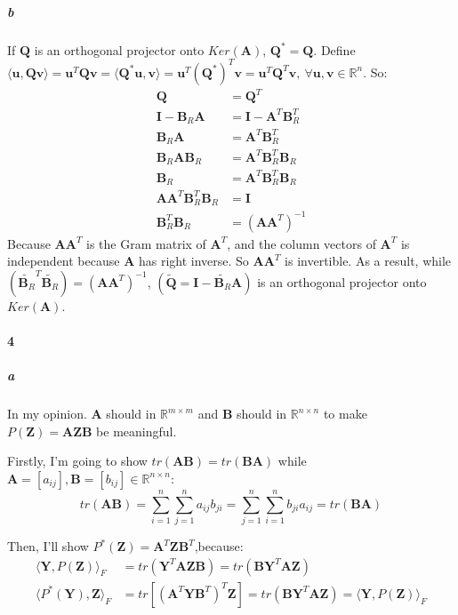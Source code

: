 \documentclass[22pt]{article}
\begin{document}
		\subparagraph{b} If $\mathbf{Q}$ is an orthogonal projector onto $Ker(\mathbf{A})$, $\mathbf{Q}^* = \mathbf{Q}$. Define $\langle \mathbf{u},\mathbf{Q}\mathbf{v} \rangle = \mathbf{u}^T\mathbf{Q}\mathbf{v}  = \langle  \mathbf{Q}^*\mathbf{u},\mathbf{v} \rangle = \mathbf{u}^T(\mathbf{Q}^*)^T\mathbf{v} = \mathbf{u}^T\mathbf{Q}^T\mathbf{v},\ \forall \mathbf{u,v} \in \mathbb{R}^n$. So:
		\begin{align}
			\mathbf{Q} & = \mathbf{Q}^T\\
			\mathbf{I} - \mathbf{B}_R\mathbf{A} & = \mathbf{I} - \mathbf{A}^T\mathbf{B}_R^T\\
			\mathbf{B}_R\mathbf{A} & = \mathbf{A}^T\mathbf{B}_R^T\\
			\mathbf{B}_R\mathbf{A}\mathbf{B}_R & = \mathbf{A}^T\mathbf{B}_R^T\mathbf{B}_R\\
			\mathbf{B}_R & = \mathbf{A}^T\mathbf{B}_R^T\mathbf{B}_R\\
			\mathbf{A}\mathbf{A}^T\mathbf{B}_R^T\mathbf{B}_R & = \mathbf{I}\\
			\mathbf{B}_R^T\mathbf{B}_R & = (\mathbf{A}\mathbf{A}^T)^{-1}
		\end{align}
		Because $\mathbf{A}\mathbf{A}^T$ is the Gram matrix of $\mathbf{A}^T$, and the column vectors of $\mathbf{A}^T$ is independent because $\mathbf{A}$ has right inverse. So $\mathbf{A}\mathbf{A}^T$ is invertible. As a result, while $(\widetilde{\mathbf{B}_R}^T \widetilde{\mathbf{B}_R} ) = (\mathbf{A}\mathbf{A}^T)^{-1}$, $(\widetilde{\mathbf{Q}} = \mathbf{I} - \widetilde{\mathbf{B}_R}\mathbf{A}) $  is an orthogonal projector onto $Ker(\mathbf{A})$.
 
	\paragraph{4}
		\subparagraph{a} In my opinion. $\mathbf{A}$ should in $\mathbb{R}^{m\times m}$ and $\mathbf{B}$ should in $\mathbb{R}^{n\times n}$ to make $P(\mathbf{Z}) = \mathbf{AZB}$ be meaningful.

		Firstly, I'm going to show $tr(\mathbf{AB}) = tr(\mathbf{BA})$ while $\mathbf{A}=[a_{ij}], \mathbf{B} = [b_{ij}] \in \mathbb{R}^{n\times n}$:
		\begin{equation}
			tr(\mathbf{AB}) = \sum\limits_{i=1}^{n}\sum\limits_{j=1}^{n} a_{ij}b_{ji} = \sum\limits_{j=1}^{n}\sum\limits_{i=1}^{n} b_{ji}a_{ij} = tr(\mathbf{BA}) 
		\end{equation}

		Then, I'll show $P^*(\mathbf{Z}) = \mathbf{A}^T\mathbf{Z}\mathbf{B}^T$,because:
		\begin{align}
			\langle \mathbf{Y},P(\mathbf{Z}) \rangle_F & = tr(\mathbf{Y}^T\mathbf{AZB}) = tr(\mathbf{BY}^T\mathbf{AZ})\\
			\langle P^*(\mathbf{Y}),\mathbf{Z} \rangle_F & = tr[(\mathbf{A}^T\mathbf{Y}\mathbf{B}^T)^T\mathbf{Z}] = tr(\mathbf{BY}^T\mathbf{AZ})=\langle \mathbf{Y},P(\mathbf{Z}) \rangle_F\\
		\end{align}
\end{document}
